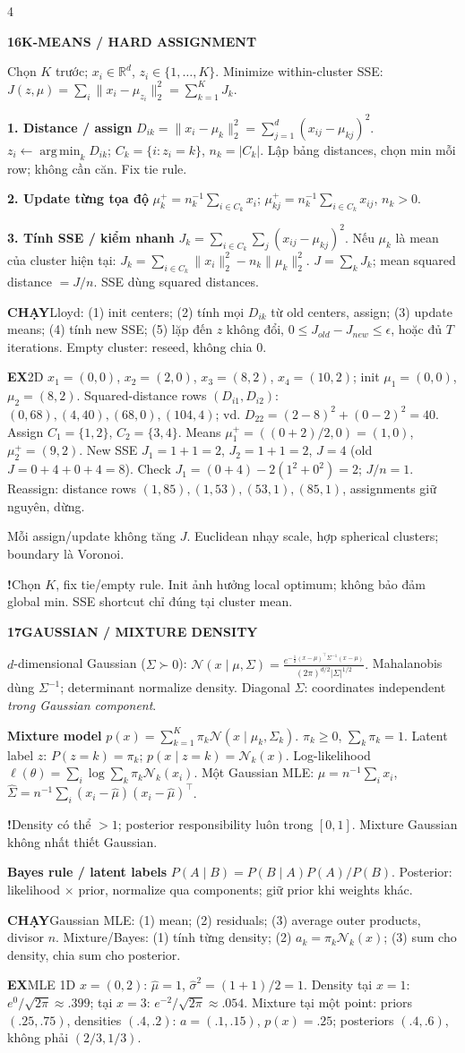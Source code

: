 \documentclass[a4paper]{article}
\newcommand{\topic}[2]{\par\addvspace{.8pt}%
  \begingroup\setlength{\fboxsep}{0.5pt}%
  \noindent\colorbox{structure}{\parbox{\dimexpr\linewidth-2\fboxsep\relax}{%
    \color{white}\fontsize{6.5}{7.1}\selectfont\bfseries #1\enspace #2}}%
  \endgroup\par\nobreak\vspace{.3pt}\nobreak}
\newcommand{\run}[1]{\key{CHẠY}#1}
\newcommand{\key}[1]{\par\textcolor{structure}{\textbf{#1}}\enspace}
\newcommand{\note}[4]{\par\begingroup\setlength{\fboxsep}{0.15pt}%
  \noindent\colorbox{#1}{\parbox{\dimexpr\linewidth-2\fboxsep\relax}{%
    \RaggedRight\textcolor{#2}{\textbf{#3}}\enspace #4}}%
  \endgroup\par}
\newcommand{\trap}[1]{\note{warningbg}{warning}{!}{#1}}
\newcommand{\ex}[1]{\note{examplebg}{example}{EX}{#1}}
\newcommand{\R}{\mathbb{R}}
\newcommand{\argmin}{\operatorname*{arg\,min}}
\newcommand{\norm}[1]{\lVert#1\rVert}
\begin{document}
\begin{multicols*}{4}
\topic{16}{K-MEANS / HARD ASSIGNMENT}
Chọn $K$ trước; $x_i\in\R^d$, $z_i\in\{1,\ldots,K\}$. Minimize within-cluster SSE:
$J(z,\mu)=\sum_i\norm{x_i-\mu_{z_i}}_2^2=\sum_{k=1}^K J_k.$
\key{1. Distance / assign}
$D_{ik}=\norm{x_i-\mu_k}_2^2=\sum_{j=1}^d(x_{ij}-\mu_{kj})^2.$
$z_i\gets\argmin_k D_{ik}$; $C_k=\{i:z_i=k\}$, $n_k=|C_k|$. Lập bảng distances, chọn min mỗi row; không cần căn. Fix tie rule.
\key{2. Update từng tọa độ}
$\mu_k^+=n_k^{-1}\sum_{i\in C_k}x_i$;
$\mu_{kj}^+=n_k^{-1}\sum_{i\in C_k}x_{ij}$, $n_k>0$.
\key{3. Tính SSE / kiểm nhanh}
$J_k=\sum_{i\in C_k}\sum_j(x_{ij}-\mu_{kj})^2$.
Nếu $\mu_k$ là mean của cluster hiện tại:
$J_k=\sum_{i\in C_k}\norm{x_i}_2^2-n_k\norm{\mu_k}_2^2$.
$J=\sum_kJ_k$; mean squared distance $=J/n$. SSE dùng squared distances.
\run{Lloyd: (1) init centers; (2) tính mọi $D_{ik}$ từ old centers, assign; (3) update means; (4) tính new SSE; (5) lặp đến $z$ không đổi, $0\le J_{old}-J_{new}\le\epsilon$, hoặc đủ $T$ iterations. Empty cluster: reseed, không chia $0$.}
\ex{2D $x_1=(0,0)$, $x_2=(2,0)$, $x_3=(8,2)$, $x_4=(10,2)$; init $\mu_1=(0,0)$, $\mu_2=(8,2)$. Squared-distance rows $(D_{i1},D_{i2})$: $(0,68),(4,40),(68,0),(104,4)$; vd. $D_{22}=(2-8)^2+(0-2)^2=40$. Assign $C_1=\{1,2\}$, $C_2=\{3,4\}$. Means $\mu_1^+=((0+2)/2,0)=(1,0)$, $\mu_2^+=(9,2)$. New SSE $J_1=1+1=2$, $J_2=1+1=2$, $J=4$ (old $J=0+4+0+4=8$). Check $J_1=(0+4)-2(1^2+0^2)=2$; $J/n=1$. Reassign: distance rows $(1,85),(1,53),(53,1),(85,1)$, assignments giữ nguyên, dừng.}
Mỗi assign/update không tăng $J$. Euclidean nhạy scale, hợp spherical clusters; boundary là Voronoi.
\trap{Chọn $K$, fix tie/empty rule. Init ảnh hưởng local optimum; không bảo đảm global min. SSE shortcut chỉ đúng tại cluster mean.}

\topic{17}{GAUSSIAN / MIXTURE DENSITY}
$d$-dimensional Gaussian ($\Sigma\succ0$):
$\mathcal N(x\mid\mu,\Sigma)=\frac{e^{-\frac12(x-\mu)^\top\Sigma^{-1}(x-\mu)}}{(2\pi)^{d/2}|\Sigma|^{1/2}}.$
Mahalanobis dùng $\Sigma^{-1}$; determinant normalize density. Diagonal $\Sigma$: coordinates independent \emph{trong Gaussian component}.
\key{Mixture model}
$p(x)=\sum_{k=1}^K\pi_k\mathcal N(x\mid\mu_k,\Sigma_k).$
$\pi_k\ge0$, $\sum_k\pi_k=1$.
Latent label $z$: $P(z=k)=\pi_k$;
$p(x\mid z=k)=\mathcal N_k(x)$.
Log-likelihood $\ell(\theta)=\sum_i\log\sum_k\pi_k\mathcal N_k(x_i)$.
Một Gaussian MLE: $\hat\mu=n^{-1}\sum_ix_i$,
$\hat\Sigma=n^{-1}\sum_i(x_i-\hat\mu)(x_i-\hat\mu)^\top$.
\trap{Density có thể $>1$; posterior responsibility luôn trong $[0,1]$. Mixture Gaussian không nhất thiết Gaussian.}
\key{Bayes rule / latent labels}
$P(A\mid B)=P(B\mid A)P(A)/P(B)$. Posterior: likelihood $\times$ prior, normalize qua components; giữ prior khi weights khác.
\run{Gaussian MLE: (1) mean; (2) residuals; (3) average outer products, divisor $n$. Mixture/Bayes: (1) tính từng density; (2) $a_k=\pi_k\mathcal N_k(x)$; (3) sum cho density, chia sum cho posterior.}
\ex{MLE 1D $x=(0,2)$: $\hat\mu=1$, $\hat\sigma^2=(1+1)/2=1$. Density tại $x=1$: $e^0/\sqrt{2\pi}\approx.399$; tại $x=3$: $e^{-2}/\sqrt{2\pi}\approx.054$. Mixture tại một point: priors $(.25,.75)$, densities $(.4,.2)$: $a=(.1,.15)$, $p(x)=.25$; posteriors $(.4,.6)$, không phải $(2/3,1/3)$.}


\end{multicols*}
\end{document}
